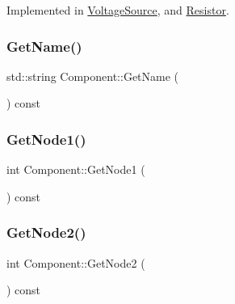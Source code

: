 Implemented in \hyperlink{classVoltageSource_a74f8a6a57480e9cff24414e106d2bbf1}{Voltage\+Source}, and \hyperlink{classResistor_a1e2d669a6b28b5b46457af5caae7462c}{Resistor}.

\mbox{\label{classComponent_a9af52e1878212622948ab2189f4f29dd}} 
\subsubsection{\texorpdfstring{Get\+Name()}{GetName()}}
{\footnotesize\ttfamily std\+::string Component\+::\+Get\+Name (\begin{DoxyParamCaption}{ }\end{DoxyParamCaption}) const\hspace{0.3cm}{\ttfamily [inline]}}

\mbox{\label{classComponent_af6503c2bf9a88eff198ffbfcc3e24876}} 
\subsubsection{\texorpdfstring{Get\+Node1()}{GetNode1()}}
{\footnotesize\ttfamily int Component\+::\+Get\+Node1 (\begin{DoxyParamCaption}{ }\end{DoxyParamCaption}) const\hspace{0.3cm}{\ttfamily [inline]}}

\mbox{\label{classComponent_aac8e1e6f5ecd3529912bd4afa0903921}} 
\subsubsection{\texorpdfstring{Get\+Node2()}{GetNode2()}}
{\footnotesize\ttfamily int Component\+::\+Get\+Node2 (\begin{DoxyParamCaption}{ }\end{DoxyParamCaption}) const\hspace{0.3cm}{\ttfamily [inline]}}

\mbox{\label{classComponent_a7c6ba16177143bc9945583a9c3df4c89}} 
